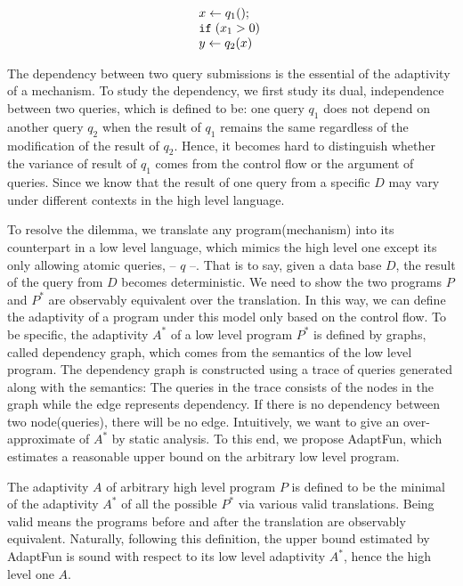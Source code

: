 \documentclass[a4paper,11pt]{article}
\newcommand{\THESYSTEM}{\textsf{AdaptFun}}
\begin{document}
\[
\begin{array}{l}
     x \leftarrow q_1() ; \\
    \mathtt{if} \; (x_1 > 0 )\; \\
     y \leftarrow q_2(x) \; \\
\end{array}
\]

The dependency between two query submissions is the essential of the adaptivity of a mechanism. To study the dependency, we first study its dual, independence between two queries, which is defined to be: one query
$q_1$ does not
depend on another query $q_2$ when the result of $q_1$ remains the
same regardless of the modification of the result of $q_2$. Hence, it becomes hard to distinguish whether the variance of result of $q_1$ comes from the control flow or the argument of queries. Since we know that the result of one query from a specific $D$ may vary under different contexts in the high level language.  


To resolve the dilemma, we translate any program(mechanism) into its counterpart in a low level language, which mimics the high level one except its only allowing atomic queries, -- $q$ --. That is to say, given a data base $D$, the result of the
query from $D$ becomes deterministic. We need to show the two programs $P$ and $P^*$ are observably equivalent over the translation. In this way, we can define the adaptivity of
a program under this model only based on the control flow.
To be specific, the adaptivity $A^*$ of a low level program $P^*$ is defined by
graphs, called dependency graph, which comes from the semantics of the low level program. The dependency graph is constructed using a
trace of queries generated along with the semantics: The queries in the trace consists of the nodes in the graph
while the edge represents dependency. If there is no dependency between
two node(queries), there will be no edge. Intuitively, we want to give an over-approximate of $A^*$ by static analysis. To this end, we propose {\THESYSTEM}, which estimates a reasonable upper bound on the arbitrary low level program.

The adaptivity $A$ of arbitrary high level program $P$ is defined to be the minimal of the adaptivity $A^*$ of all the possible $P^*$ via various valid translations. Being valid means the programs before and after the translation are observably equivalent. Naturally, following this definition, the upper bound estimated by {\THESYSTEM} is sound with respect to its low level adaptivity $A^*$, hence the high level one $A$. 
\end{document}
